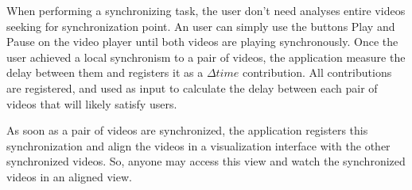 When performing a synchronizing task, the user don't need analyses entire videos seeking for synchronization point. An user can simply use the buttons Play and Pause on the video player until both videos are playing synchronously. Once the user achieved a local synchronism to a pair of videos, the application measure the delay between them and registers it as a $\Delta{time}$ contribution. All contributions are registered, and used as input to calculate the delay between each pair of videos that will likely satisfy users.

As soon as a pair of videos are synchronized, the application registers this synchronization and align the videos in a visualization interface with the other synchronized videos. So, anyone may access this view and watch the synchronized videos in an aligned view.
